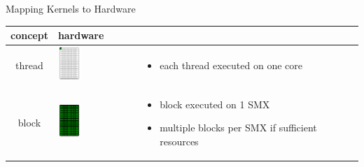 \begin{frame}[fragile]{Mapping Kernels to Hardware}
\begin{center}
\vspace{-0.75cm}
\begin{tabular}{|c|m{4cm}|m{5cm}|}
    \cline{1-2}
        concept & hardware &  \multicolumn{1}{c}{} \\
    \hline
        thread &
        \begin{minipage}{4cm}
            \includegraphics[width=0.3\textwidth]{./images/core.pdf}
        \end{minipage} &
        \footnotesize
        \begin{itemize}
            \item each thread executed on one core
        \end{itemize} \\
    \hline
        block &
        \begin{minipage}{4cm}
            \includegraphics[width=0.3\textwidth]{./images/smx.pdf}
        \end{minipage} &
        \footnotesize
        \begin{itemize}
            \item block executed on 1 SMX
            \item multiple blocks per SMX if sufficient resources

\end{itemize}
\end{tabular}
\end{center}
\end{frame}
